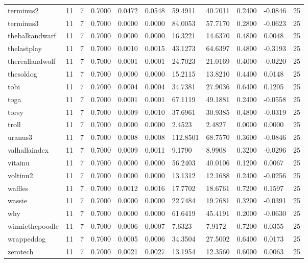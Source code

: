 \begin{table}[htbp]
\begin{tabular}{lllllllllll}
terminus2 & 11 & 7 & 0.7000 & 0.0472 & 0.0548 & 59.4911 & 40.7011 & 0.2400 & -0.0846 & 25 \\
terminus3 & 11 & 7 & 0.7000 & 0.0000 & 0.0000 & 84.0053 & 57.7170 & 0.2800 & -0.0623 & 25 \\
thebalkandwarf & 11 & 7 & 0.7000 & 0.0000 & 0.0000 & 16.3221 & 14.6370 & 0.4800 & 0.0048 & 25 \\
thelastplay & 11 & 7 & 0.7000 & 0.0010 & 0.0015 & 43.1273 & 64.6397 & 0.4800 & -0.3193 & 25 \\
thereallandwolf & 11 & 7 & 0.7000 & 0.0001 & 0.0001 & 24.7023 & 21.0169 & 0.4000 & -0.0220 & 25 \\
thesoldog & 11 & 7 & 0.7000 & 0.0000 & 0.0000 & 15.2115 & 13.8210 & 0.4400 & 0.0148 & 25 \\
tobi & 11 & 7 & 0.7000 & 0.0004 & 0.0004 & 34.7381 & 27.9036 & 0.6400 & 0.1205 & 25 \\
toga & 11 & 7 & 0.7000 & 0.0001 & 0.0001 & 67.1119 & 49.1881 & 0.2400 & -0.0558 & 25 \\
torsy & 11 & 7 & 0.7000 & 0.0009 & 0.0010 & 37.6961 & 30.9385 & 0.4800 & -0.0319 & 25 \\
troll & 11 & 7 & 0.7000 & 0.0000 & 0.0000 & 2.4523 & 2.4827 & 0.0000 & 0.0000 & 25 \\
uranus3 & 11 & 7 & 0.7000 & 0.0008 & 0.0008 & 112.8501 & 68.7570 & 0.3600 & -0.0846 & 25 \\
valhallaindex & 11 & 7 & 0.7000 & 0.0009 & 0.0011 & 9.1790 & 8.9908 & 0.3200 & -0.0296 & 25 \\
vitainu & 11 & 7 & 0.7000 & 0.0000 & 0.0000 & 56.2403 & 40.0106 & 0.1200 & 0.0067 & 25 \\
voltinu2 & 11 & 7 & 0.7000 & 0.0000 & 0.0000 & 13.1312 & 12.1688 & 0.2400 & -0.0256 & 25 \\
waffles & 11 & 7 & 0.7000 & 0.0012 & 0.0016 & 17.7702 & 18.6761 & 0.7200 & 0.1597 & 25 \\
wassie & 11 & 7 & 0.7000 & 0.0000 & 0.0000 & 22.7484 & 19.7681 & 0.3200 & -0.0391 & 25 \\
why & 11 & 7 & 0.7000 & 0.0000 & 0.0000 & 61.6419 & 45.4191 & 0.2000 & -0.0630 & 25 \\
winniethepoodle & 11 & 7 & 0.7000 & 0.0006 & 0.0007 & 7.6323 & 7.9172 & 0.7200 & 0.0355 & 25 \\
wrappeddog & 11 & 7 & 0.7000 & 0.0005 & 0.0006 & 34.3504 & 27.5002 & 0.6400 & 0.0173 & 25 \\
zerotech & 11 & 7 & 0.7000 & 0.0021 & 0.0027 & 13.1954 & 12.3560 & 0.6000 & 0.0063 & 25 \\

\end{tabular}
\end{table}
